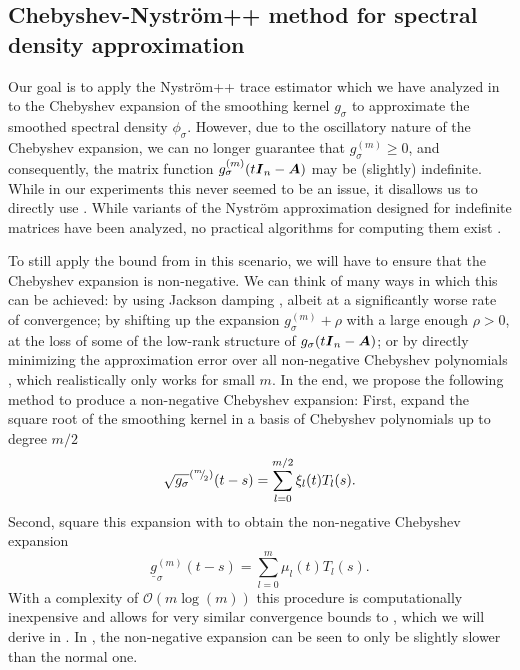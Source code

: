 \subsection{Chebyshev-Nyström++ method for spectral density approximation}
\label{subsec:chebyshev-nystrom}

Our goal is to apply the Nyström++ trace estimator which we have analyzed in  to the Chebyshev expansion of the smoothing kernel $g_{\sigma}$ to approximate the smoothed spectral density $\phi_{\sigma}$. However, due to the oscillatory nature of the Chebyshev expansion, we can no longer guarantee that $g_{\sigma}^{(m)} \geq 0$, and consequently, the matrix function $g_{\sigma}^{(m)}(t \boldsymbol{I}_n - \boldsymbol{A})$ may be (slightly) indefinite. While in our experiments this never seemed to be an issue, it disallows us to directly use . While variants of the Nyström approximation designed for indefinite matrices have been analyzed, no practical algorithms for computing them exist \cite{nakatsukasa-2023-randomized-lowrank}.

To still apply the bound from  in this scenario, we will have to ensure that the Chebyshev expansion is non-negative. We can think of many ways in which this can be achieved: by using Jackson damping \cite{jackson-1912-approximation-trigonometric,braverman-2022-sublinear-time}, albeit at a significantly worse rate of convergence; by shifting up the expansion $g_{\sigma}^{(m)} + \rho$ with a large enough $\rho > 0$, at the loss of some of the low-rank structure of $g_{\sigma}(t \boldsymbol{I}_n - \boldsymbol{A})$; or by directly minimizing the approximation error over all non-negative Chebyshev polynomials \cite{fejer-1916-uber-trigonometrische}, which realistically only works for small $m$. In the end, we propose the following method to produce a non-negative Chebyshev expansion: First, expand the square root of the smoothing kernel in a basis of Chebyshev polynomials up to degree $m/2$
\begin{equation}
    \sqrt{g_{\sigma}}^{({}^{m}{\mskip -5mu/\mskip -3mu}_{2})}(t - s) = \sum_{l=0}^{m/2} \xi_l(t) T_l(s).
\end{equation}
Second, square this expansion with  to obtain the non-negative Chebyshev expansion
\begin{equation}
    \underline{g}^{(m)}_{\sigma}(t - s) = \sum_{l=0}^{m} \mu_l(t) T_l(s).
    \label{equ:non-negative-chebyshev-expansion}
\end{equation}
With a complexity of $\mathcal{O}(m \log(m))$ this procedure is computationally inexpensive and allows for very similar convergence bounds to , which we will derive in . In , the non-negative expansion can be seen to only be slightly slower than the normal one.

